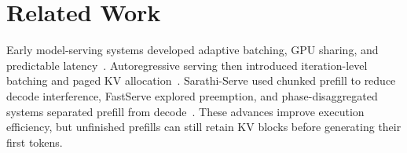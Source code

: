\documentclass[sigconf,anonymous,review]{acmart}
\begin{document}
\begin{table}[t]
\centering
\caption{Parameter sensitivity at 1,024 KV blocks.
C is serving capacity (QPS) under a 2-s mean-TTFT
limit; L is mean TTFT (ms) at 2 QPS.
Bold indicates the default setting.}
\label{tab:parameter-sensitivity-main}

\vspace{3pt}
\small
\renewcommand{\arraystretch}{1.10}
\setlength{\tabcolsep}{3pt}

\end{table}
\section{Related Work}
\label{sec:related-work}

Early model-serving systems developed adaptive batching, GPU sharing, and predictable latency~\cite{rw_clipper2017,rw_nexus2019,rw_clockwork2020,rw_infaas2021}. Autoregressive serving then introduced iteration-level batching and paged KV allocation~\cite{intro_orca,intro_vllm}. Sarathi-Serve used chunked prefill to reduce decode interference, FastServe explored preemption, and phase-disaggregated systems separated prefill from decode~\cite{intro_sarathi,wu2026fastserve,patel2024splitwise,zhong2024distserve}. These advances improve execution efficiency, but unfinished prefills can still retain KV blocks before generating their first tokens.
\end{document}

